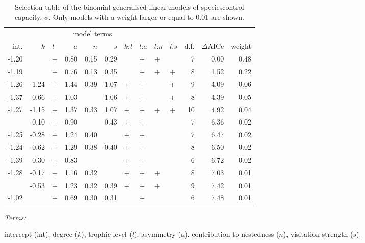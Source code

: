 \documentclass[a4paper]{artikel1}
\theoremstyle{definition}
\theoremstyle{definition}
\theoremstyle{definition}
\theoremstyle{remark}
\providecommand{\DIFaddtex}[1]{{\protect\color{blue}\uwave{#1}}} %
\providecommand{\DIFaddFL}[1]{\DIFadd{#1}} %
\providecommand{\DIFaddbeginFL}{} %
\providecommand{\DIFaddendFL}{} %
\providecommand{\DIFadd}[1]{\texorpdfstring{\DIFaddtex{#1}}{#1}} %
\begin{document}
\begin{table}

\caption{\label{tab:tab-model-selection-table}Selection table of the binomial generalised linear models of species\DIFaddbeginFL \DIFaddFL{' }\DIFaddendFL control capacity, $\phi$. Only models with a weight larger or equal to 0.01 are shown.}
\centering
\fontsize{8}{10}\selectfont
\begin{threeparttable}
\begin{tabular}[t]{rrlrrrllllrrr}
\toprule
\multicolumn{10}{c}{model terms} & \multicolumn{ 3}{c}{ } \\
\cmidrule(l{2pt}r{2pt}){1-10}
int. & $k$ & $l$ & $a$ & $n$ & $s$ & $k$:$l$ & $l$:$a$ & $l$:$n$ & $l$:$s$ & d.f. & $\Delta$AICc & weight\\
\midrule
-1.20 &  & + & 0.80 & 0.15 & 0.29 &  & + & + &  & 7 & 0.00 & 0.48\\
-1.19 &  & + & 0.76 & 0.13 & 0.35 &  & + & + & + & 8 & 1.52 & 0.22\\
-1.26 & -1.24 & + & 1.44 & 0.39 & 1.07 & + & + &  & + & 9 & 4.09 & 0.06\\
-1.37 & -0.66 & + & 1.03 &  & 1.06 & + & + &  & + & 8 & 4.39 & 0.05\\
-1.27 & -1.15 & + & 1.37 & 0.33 & 1.07 & + & + & + & + & 10 & 4.92 & 0.04\\
\addlinespace
-1.37 & -0.10 & + & 0.90 &  & 0.43 & + & + &  &  & 7 & 6.36 & 0.02\\
-1.25 & -0.28 & + & 1.24 & 0.40 &  & + & + &  &  & 7 & 6.47 & 0.02\\
-1.24 & -0.62 & + & 1.29 & 0.38 & 0.40 & + & + &  &  & 8 & 6.50 & 0.02\\
-1.39 & 0.30 & + & 0.83 &  &  & + & + &  &  & 6 & 6.72 & 0.02\\
-1.28 & -0.17 & + & 1.16 & 0.32 &  & + & + & + &  & 8 & 7.03 & 0.01\\
\addlinespace
-1.26 & -0.53 & + & 1.23 & 0.32 & 0.39 & + & + & + &  & 9 & 7.42 & 0.01\\
-1.02 &  & + & 0.69 & 0.30 & 0.31 &  & + &  &  & 6 & 7.48 & 0.01\\
\bottomrule
\end{tabular}
\begin{tablenotes}[para]
\item \textit{Terms: } 
\item intercept (int), degree ($k$), trophic level ($l$), asymmetry ($a$), contribution to nestedness ($n$), visitation strength ($s$).
\end{tablenotes}
\end{threeparttable}
\end{table}
\end{document}
